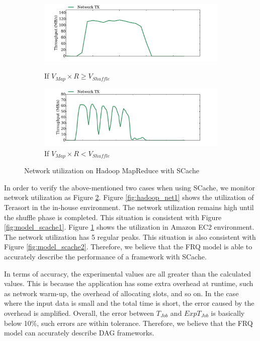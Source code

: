{\begin{figure}
	\centering
	\begin{minipage}[hb]{\linewidth}
		\begin{subfigure}{\linewidth}
			\begin{minipage}{\linewidth}
				\includegraphics[width=\linewidth]{fig/hadoop_net1}
				\caption{\color{blue}If \(V_{Map} \times R \ge V_{Shuffle}\)}
				\label{fig:hadoop_net1}
			\end{minipage}
			\begin{minipage}{\linewidth}
				\includegraphics[width=\linewidth]{fig/hadoop_net2}
				\caption{\color{blue}If \(V_{Map} \times R < V_{Shuffle}\)}
				\label{fig:hadoop_net2}
			\end{minipage}
		\end{subfigure}
		\caption{\color{blue}Network utilization on Hadoop MapReduce with SCache}
		\label{fig:hadoop_net}
	\end{minipage}
\end{figure}

In order to verify the above-mentioned two cases when using SCache, we monitor network utilization as Figure \ref{fig:hadoop_net}. Figure \ref{fig:hadoop_net1} shows the utilization of Terasort in the in-house environment. The network utilization remains high until the shuffle phase is completed. This situation is consistent with Figure \ref{fig:model_scache1}. Figure \ref{fig:hadoop_net2} shows the utilization in Amazon EC2 environment. 
The network utilization has 5 regular peaks. This situation is also consistent with Figure \ref{fig:model_scache2}. Therefore, we believe that the FRQ model is able to accurately describe the performance of a framework with SCache.

In terms of accuracy, the experimental values are all greater than the calculated values. This is because the application has some extra overhead at runtime, such as network warm-up, the overhead of allocating slots, and so on. In the case where the input data is small and the total time is short, the error caused by the overhead is amplified. Overall, the error between \(T_{Job}\) and \(ExpT_{Job}\) is basically below 10\%, such errors are within tolerance. Therefore, we believe that the FRQ model can accurately describe DAG frameworks.
}